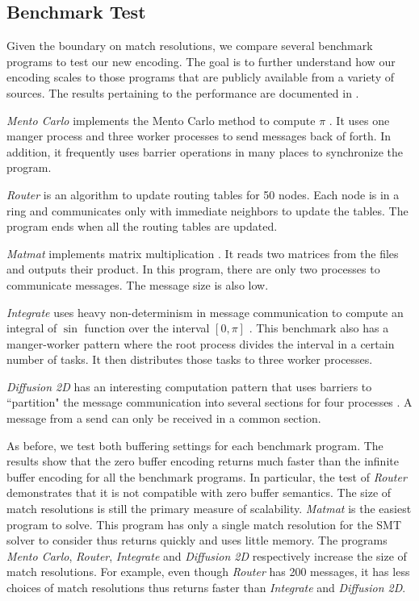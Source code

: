 \subsection{Benchmark Test}
Given the boundary on match resolutions, we compare several benchmark programs to test our new encoding. The goal is to further understand how our encoding scales to those programs that are publicly available from a variety of sources. The results pertaining to the performance are documented in . 

\begin{compactitem}

\item \textit{Mento Carlo} implements the Mento Carlo method to compute $\pi$ \cite{benchmark:mentoCarlo}. It uses one manger process and three worker processes to send messages back of forth. In addition, it frequently uses barrier operations in many places to synchronize the program. 
\item \textit{Router} is an algorithm to update routing tables for 50 nodes. Each node is in a ring and communicates only with immediate neighbors to update the tables. The program ends when all the routing tables are updated. 
\item \textit{Matmat} implements matrix multiplication \cite{benchmark:fevs}. It reads two matrices from the files and outputs their product. In this program, there are only two processes to communicate messages. The message size is also low.
\item \textit{Integrate} uses heavy non-determinism in message communication to compute an integral of $\sin$ function over the interval $[0, \pi]$ \cite{benchmark:fevs}. This benchmark also has a manger-worker pattern where the root process divides the interval in a certain number of tasks. It then distributes those tasks to three worker processes. %
\item \textit{Diffusion 2D} has an interesting computation pattern that uses barriers to ``partition" the message communication into several sections for four processes \cite{benchmark:fevs}. A message from a send can only be received in a common section. 
\end{compactitem}

As before, we test both buffering settings for each benchmark program. The results show that the zero buffer encoding returns much faster than the infinite buffer encoding for all the benchmark programs. In particular, the test of \textit{Router} demonstrates that it is not compatible with zero buffer semantics. The size of match resolutions is still the primary measure of scalability. \textit{Matmat} is the easiest program to solve. This program has only a single match resolution for the SMT solver to consider thus returns quickly and uses little memory. The programs \textit{Mento Carlo}, \textit{Router}, \textit{Integrate} and \textit{Diffusion 2D} respectively increase the size of match resolutions. For example, even though \textit{Router} has 200 messages, it has less choices of match resolutions thus returns faster than \textit{Integrate} and \textit{Diffusion 2D}. 

